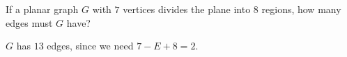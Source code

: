 \begin{questions}
\question If a planar graph $G$ with $7$ vertices divides the plane into 8 regions, how many edges must $G$ have?

  \begin{answer}
  $G$ has $13$ edges, since we need $7 - E + 8 = 2$.
  \end{answer}



%
%




\end{questions}
